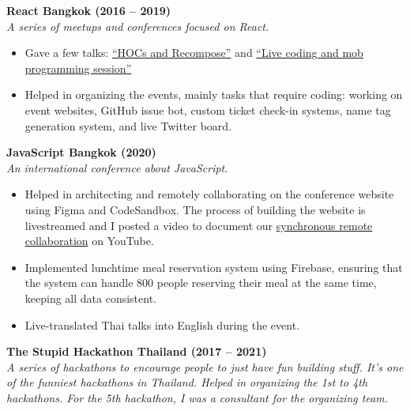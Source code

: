 \documentclass[a4paper]{article}
\begin{document}
\vspace{2mm}

\textbf{React Bangkok (2016 – 2019)}\\
\textit{A series of meetups and conferences focused on React.}

\begin{itemize} \itemsep 1pt
    
	\item Gave a few talks: \href{https://dt.in.th/higher-order-components-and-recompose-talk.html}{“HOCs and Recompose”} and \href{https://dt.in.th/reactbkk2-live-coding.html}{“Live coding and mob programming session”}
    
	\item Helped in organizing the events, mainly tasks that require coding: working on event websites, GitHub issue bot, custom ticket check-in systems, name tag generation system, and live Twitter board.
    
\end{itemize}

\vspace{2mm}

\textbf{JavaScript Bangkok (2020)}\\
\textit{An international conference about JavaScript.}

\begin{itemize} \itemsep 1pt
    
	\item Helped in architecting and remotely collaborating on the conference website using Figma and CodeSandbox. The process of building the website is livestreamed and I posted a video to document our \href{https://youtu.be/watch?v=uQH2R-BE1lw}{synchronous remote collaboration} on YouTube.
    
	\item Implemented lunchtime meal reservation system using Firebase, ensuring that the system can handle 800 people reserving their meal at the same time, keeping all data consistent.
    
	\item Live-translated Thai talks into English during the event.
    
\end{itemize}

\vspace{2mm}

\textbf{The Stupid Hackathon Thailand (2017 – 2021)}\\
\textit{A series of hackathons to encourage people to just have fun building stuff. It’s one of the funniest hackathons in Thailand. Helped in organizing the 1st to 4th hackathons. For the 5th hackathon, I was a consultant for the organizing team.}
\end{document}
